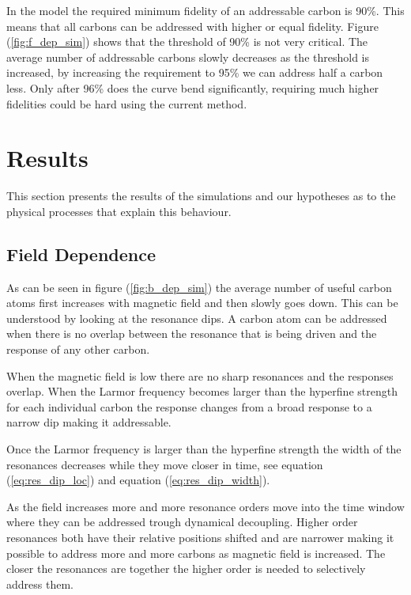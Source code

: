 In the model the required minimum fidelity of an addressable carbon is 90\%. This means that all carbons can be addressed with higher or equal fidelity. Figure (\autoref{fig:f_dep_sim}) shows that the threshold of 90\% is not very critical. The average number of addressable carbons slowly decreases as the threshold is increased, by increasing the requirement to 95\% we can address half a carbon less. Only after 96\% does the curve bend significantly, requiring much higher fidelities could be hard using the current method. 

\section{Results}
\label{results}

This section presents the results of the simulations and our hypotheses as to the physical processes that explain this behaviour. 

\subsection{Field Dependence}
\label{fielddependence}

As can be seen in figure (\autoref{fig:b_dep_sim}) the average number of useful carbon atoms first increases with magnetic field and then slowly goes down. This can be understood by looking at the resonance dips. A carbon atom can be addressed when there is no overlap between the resonance that is being driven and the response of any other carbon. 

When the magnetic field is low there are no sharp resonances and the responses overlap. When the Larmor frequency becomes larger than the hyperfine strength for each individual carbon the response changes from a broad response to a narrow dip making it addressable. 

Once the Larmor frequency is larger than the hyperfine strength the width of the resonances decreases while they move closer in time, see equation (\autoref{eq:res_dip_loc}) and equation (\autoref{eq:res_dip_width}). 

As the field increases more and more resonance orders move into the time window where they can be addressed trough dynamical decoupling. Higher order resonances both have their relative positions shifted and are narrower making it possible to address more and more carbons as magnetic field is increased. The closer the resonances are together the higher order is needed to selectively address them. 

